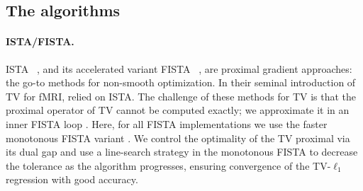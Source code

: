 \subsection{The algorithms}
\paragraph{ISTA/FISTA.}
ISTA~ \citep{daubechies2004}, and its accelerated variant
FISTA~ \citep{beck2009a}, are proximal gradient approaches: the go-to
methods for non-smooth optimization. In their seminal introduction of TV
for fMRI,  \citep{michel2011} relied on ISTA.
The challenge of these methods for TV is that the proximal operator
  of TV
cannot be computed exactly; we approximate it in an inner FISTA loop
 \citep{beck2009b,michel2011}.
Here, for all FISTA implementations we use
the faster monotonous FISTA variant  \citep{beck2009b}. We control the
optimality of the TV proximal via its dual gap  \citep{michel2011} and
use a line-search strategy in the monotonous FISTA to decrease the
tolerance as the algorithm progresses, ensuring convergence of the
TV-$\ell_1$ regression with good accuracy.

